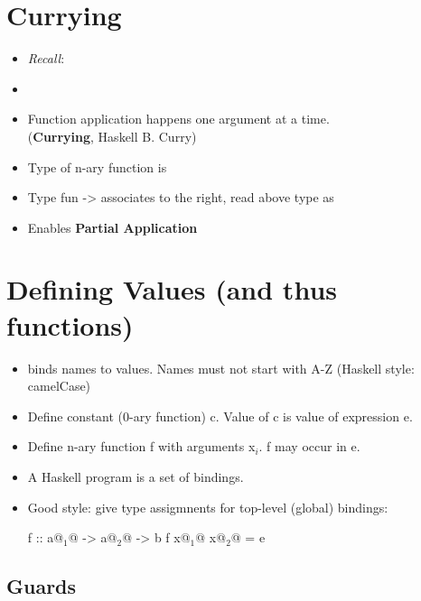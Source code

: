 \section{Currying}

\begin{itemize}
  \item \textit{Recall}: 
  \item {}
  \item Function application happens one argument at a time. \\ (\textbf{Currying}, Haskell B. Curry)
  \item Type of n-ary function is \\ 
  \item Type fun -> associates to the right, read above type as \\ 
  \item Enables \textbf{Partial Application}
\end{itemize}


\section{Defining Values (and thus functions)}

\begin{itemize}
  \item \codeline{=} binds names to values. Names must not start with A-Z (Haskell style: camelCase)
  \item Define constant (0-ary function) c. Value of c is value of expression e. \\ 
  \item Define n-ary function f with arguments x$_i$. f may occur in e. \\ 
  \item A Haskell program is a set of bindings.
  \item Good style: give type assigmnents for top-level (global) bindings:\\
  \begin{Haskell}
f :: a@$_1$@ -> a@$_2$@ -> b
f x@$_1$@ x@$_2$@ = e
  \end{Haskell}
\end{itemize}

\subsection{Guards}

